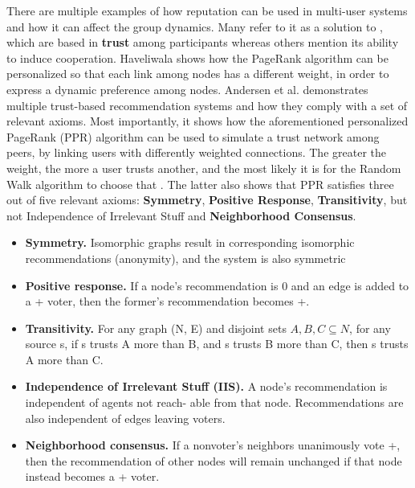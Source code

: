 There are multiple examples of how reputation can be used in multi-user systems and how it can affect the group dynamics. Many refer to it as a solution to , which are based in \textbf{trust} among participants whereas others mention its ability to induce cooperation. Haveliwala \cite{Haveliwala2003} shows how the PageRank algorithm can be personalized so that each link among nodes has a different weight, in order to express a dynamic preference among nodes. Andersen et al. \cite{Andersen2008} demonstrates multiple trust-based recommendation systems and how they comply with a set of relevant axioms. Most importantly, it shows how the aforementioned personalized PageRank (PPR) algorithm can be used to simulate a trust network among peers, by linking users with differently weighted connections. The greater the weight, the more a user trusts another, and the most likely it is for the Random Walk algorithm to choose that . The latter also shows that PPR satisfies three out of five relevant axioms: \textbf{Symmetry}, \textbf{Positive Response}, \textbf{Transitivity}, but not Independence of Irrelevant Stuff and \textbf{Neighborhood Consensus}.
\begin{itemize}
    \item \textbf{Symmetry.} Isomorphic graphs result in corresponding isomorphic recommendations (anonymity), and the system is also symmetric
    \item \textbf{Positive response.} If a node’s recommendation is 0 and an edge is added to a + voter, then the former’s recommendation becomes +.
    \item \textbf{Transitivity.} For any graph (N, E) and disjoint sets $ A, B, C \subseteq N $, for any source s, if s trusts A more than B, and s trusts B more than C, then s trusts A more than C.
    \item \textbf{Independence of Irrelevant Stuﬀ (IIS).} A node’s recommendation is independent of agents not reach- able from that node. Recommendations are also independent of edges leaving voters.
    \item \textbf{Neighborhood consensus.} If a nonvoter’s neighbors unanimously vote +, then the recommendation of other nodes will remain unchanged if that node instead becomes a + voter.
\end{itemize}

